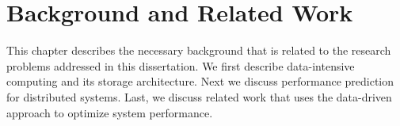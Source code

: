 \chapter{Background and Related Work}
\label{chapter:background}

This chapter describes the necessary background that is related to
the research problems addressed in this dissertation.
We first describe data-intensive computing and its storage architecture.
Next we discuss performance prediction for distributed systems.
Last, we discuss related work that uses the data-driven approach
to optimize system performance.



%

%
%
